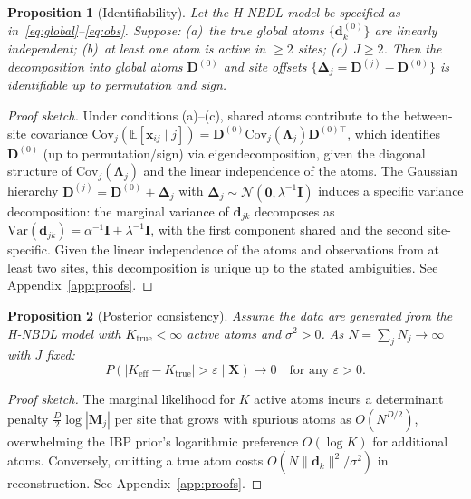 \documentclass[11pt,a4paper]{article}
\newtheorem{proposition}{Proposition}
\theoremstyle{definition}
\begin{document}
\begin{proposition}[Identifiability]\label{prop:identifiability}
Let the H-NBDL model be specified as in~\eqref{eq:global}--\eqref{eq:obs}. Suppose: (a)~the true global atoms $\{\mathbf{d}^{(0)}_k\}$ are linearly independent; (b)~at least one atom is active in $\geq 2$ sites; (c)~$J \geq 2$. Then the decomposition into global atoms $\mathbf{D}^{(0)}$ and site offsets $\{\boldsymbol{\Delta}_j = \mathbf{D}^{(j)} - \mathbf{D}^{(0)}\}$ is identifiable up to permutation and sign.
\end{proposition}
\begin{proof}[Proof sketch]
Under conditions (a)--(c), shared atoms contribute to the between-site covariance $\mathrm{Cov}_j(\mathbb{E}[\mathbf{x}_{ij} \mid j]) = \mathbf{D}^{(0)} \mathrm{Cov}_j(\boldsymbol{\Lambda}_j) \mathbf{D}^{(0)\top}$, which identifies $\mathbf{D}^{(0)}$ (up to permutation/sign) via eigendecomposition, given the diagonal structure of $\mathrm{Cov}_j(\boldsymbol{\Lambda}_j)$ and the linear independence of the atoms. The Gaussian hierarchy $\mathbf{D}^{(j)} = \mathbf{D}^{(0)} + \boldsymbol{\Delta}_j$ with $\boldsymbol{\Delta}_j \sim \mathcal{N}(\mathbf{0}, \lambda^{-1}\mathbf{I})$ induces a specific variance decomposition: the marginal variance of $\mathbf{d}_{jk}$ decomposes as $\mathrm{Var}(\mathbf{d}_{jk}) = \alpha^{-1}\mathbf{I} + \lambda^{-1}\mathbf{I}$, with the first component shared and the second site-specific. Given the linear independence of the atoms and observations from at least two sites, this decomposition is unique up to the stated ambiguities. See Appendix~\ref{app:proofs}.
\end{proof}

\begin{proposition}[Posterior consistency]\label{prop:consistency}
Assume the data are generated from the H-NBDL model with $K_{\mathrm{true}} < \infty$ active atoms and $\sigma^2 > 0$. As $N = \sum_j N_j \to \infty$ with $J$ fixed:
\begin{equation}
  P(|K_{\mathrm{eff}} - K_{\mathrm{true}}| > \varepsilon \mid \mathbf{X}) \to 0 \quad \text{for any } \varepsilon > 0.
\end{equation}
\end{proposition}
\begin{proof}[Proof sketch]
The marginal likelihood for $K$ active atoms incurs a determinant penalty $\frac{D}{2}\log|\mathbf{M}_j|$ per site that grows with spurious atoms as $O(N^{D/2})$, overwhelming the IBP prior's logarithmic preference $O(\log K)$ for additional atoms. Conversely, omitting a true atom costs $O(N\|\mathbf{d}_k\|^2/\sigma^2)$ in reconstruction. See Appendix~\ref{app:proofs}.
\end{proof}
\end{document}
